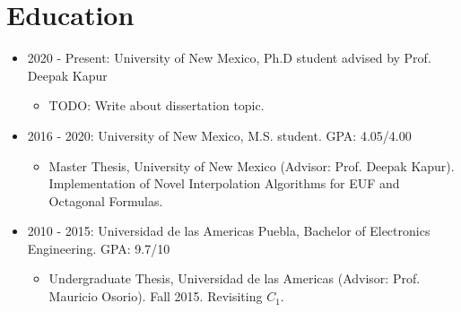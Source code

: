 \section{Education}

\begin{itemize}
\item 2020 - Present: University of New Mexico, Ph.D student advised by
  Prof. Deepak Kapur
  \begin{itemize}
    \item TODO: Write about dissertation topic.
  \end{itemize}
\item 2016 - 2020: University of New Mexico, M.S. student. GPA: 4.05/4.00
  \begin{itemize}
    \item Master Thesis, University of New Mexico (Advisor: Prof. Deepak Kapur).
  Implementation of Novel Interpolation Algorithms for EUF and Octagonal Formulas.

  \end{itemize}
\item 2010 - 2015: Universidad de las Americas Puebla, Bachelor of
  Electronics Engineering. GPA: 9.7/10
  \begin{itemize}
    \item Undergraduate Thesis, Universidad de las Americas (Advisor: Prof.
  Mauricio Osorio). Fall 2015. Revisiting $C_1$.
  \end{itemize}
\end{itemize}


